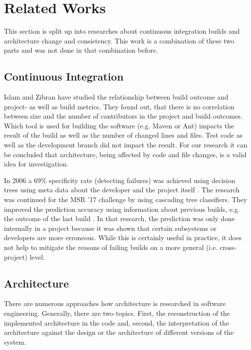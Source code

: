 \documentclass[conference]{IEEEtran}
\begin{document}
\section{Related Works}

This section is split up into researches about continuous integration builds and architecture change and consistency. This work is a combination of these two parts and was not done in that combination before. 

\subsection{Continuous Integration}

Islam and Zibran \cite{FailsCorr} have studied the relationship between build outcome and project- as well as build metrics. They found out, that there is no correlation between size and the number of contributors in the project and build outcomes. Which tool is used for building the software (e.g. Maven or Ant) impacts the result of the build as well as the number of changed lines and files. Test code as well as the development branch did not impact the result. For our research it can be concluded that architecture, being affected by code and file changes, is a valid idea for investigation. 

In 2006 a 69\% specificity rate (detecting failures) was achieved using decision trees using meta data about the developer and the project itself \cite{Pred-Tree}.
The research was continued for the MSR '17 challenge by using cascading tree classifiers. They improved the prediction accuracy using information about previous builds, e.g. the outcome of the last build \cite{Pred-Cascade}. 
In that research, the prediction was only done internally in a project because it was shown that certain subsystems or developers are more erroneous. While this is certainly useful in practice, it does not help to mitigate the reasons of failing builds on a more general (i.e. cross-project) level.

\subsection{Architecture}

There are numerous approaches how architecture is researched in software engineering. Generally, there are two topics. First, the reconstruction of the implemented architecture in the code and, second, the interpretation of the architecture against the design or the architecture of different versions of the system.
\end{document}
